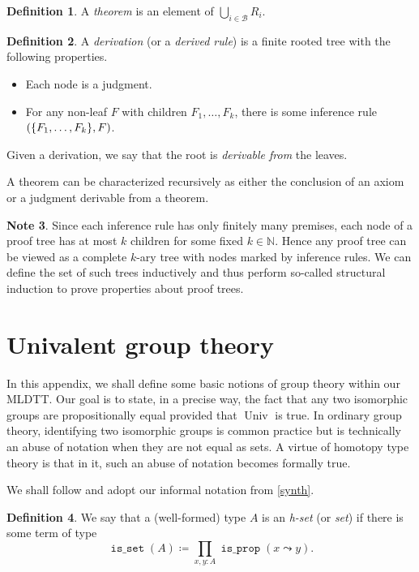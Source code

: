 \documentclass[10pt,letterpaper,cm]{nupset}
\theoremstyle{definition}
\newtheorem{definition}{Definition}[subsection]
\newtheorem{note}[definition]{Note}
\theoremstyle{theorem}
\theoremstyle{remark}
\newcommand{\0}{\mathbf{0}}
\newcommand{\1}{\mathbf{1}}
\newcommand{\2}{\mathbf{2}}
\DeclareMathOperator{\isprop}{\mathtt{is\_prop}}
\DeclareMathOperator{\isset}{\mathtt{is\_set}}
\DeclareMathOperator{\univ}{\mathrm{Univ}}
\newcommand{\N}{\mathbb N}
\newcommand{\bi}{\begin{itemize}}
\newcommand{\ei}{\end{itemize}}
\begin{document}
\begin{definition}
A \textit{theorem} is an element of $\bigcup_{i\in \mathcal{B}}R_i$.
\end{definition}

\begin{definition}
A \textit{derivation} (or a \textit{derived rule}) is a finite rooted tree with the following properties.
\bi
\item Each node is a judgment.
\item For any non-leaf $F$ with children $F_1, \ldots, F_k$, there is some inference rule $\mleft(\mleft\{F_1, \ldots, F_k\mright\}, F\mright)$.
\ei
\end{definition}
Given a derivation, we say that the root  is \textit{derivable from} the leaves.

\medskip

A theorem can be characterized recursively as either the conclusion of an axiom or a judgment derivable from a theorem.  

\begin{note}
Since each inference rule has only finitely many premises, each node of a proof tree has at most $k$ children for some fixed $k \in \N$. Hence any proof tree can be viewed as a complete $k$-ary tree with nodes marked by inference rules. We can define the set of such trees inductively and thus perform so-called structural induction to prove properties about proof trees.
\end{note}

\section{Univalent group theory}\label{groups}

In this appendix, we shall define some basic notions of group theory within our MLDTT. Our goal is to state, in a precise way, the fact that any two isomorphic groups are propositionally equal provided that $\univ$ is true.  In ordinary group theory, identifying two isomorphic groups  is common practice  but is technically an abuse of notation when they are not equal as sets. A virtue of homotopy type theory is that in it, such an abuse of notation becomes formally true.

\medskip
We shall follow \cite[Section 11.2]{Rijke} and adopt  our informal notation from \cref{synth}.

\bigskip

\begin{definition}
We say that a (well-formed) type $A$ is an \textit{h-set} (or \textit{set}) if there is some term of type $$ \isset(A) \coloneqq \prod_{x,y:A}\isprop(x\leadsto y)    .$$ 
\end{definition}
\end{document}
